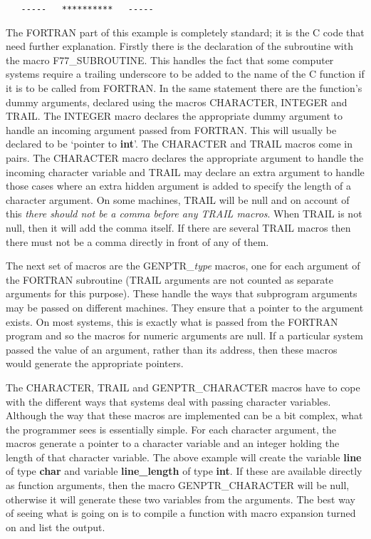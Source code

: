 \begin{verbatim}
   -----   **********   -----
\end{verbatim}

The FORTRAN part of this example is completely standard; it is the C code that
need further explanation. Firstly there is the declaration of the subroutine
with the macro F77\_SUBROUTINE. This handles the fact that some computer
systems require a trailing underscore to be added to the name of the C function
if it is to be called from FORTRAN. In the same statement there are the
function's dummy arguments, declared using the macros CHARACTER, INTEGER and
TRAIL. The INTEGER macro declares the appropriate dummy argument to handle an
incoming argument passed from FORTRAN. This will usually be declared to be
`pointer to {\bf int}'. The CHARACTER and TRAIL macros come in pairs. The
CHARACTER macro declares the appropriate argument to handle the incoming
character variable and TRAIL may declare an extra argument to handle those
cases where an extra hidden argument is added to specify the length of a
character argument. On some machines, TRAIL will be null and on account of this
{\em there should not be a comma before any TRAIL macros}. When TRAIL is not
null, then it will add the comma itself. If there are several TRAIL macros then
there must not be a comma directly in front of any of them.

The next set of macros are the GENPTR\_{\it type}\/ macros, one for each
argument of the FORTRAN subroutine (TRAIL arguments are not counted as separate
arguments for this purpose). These handle the ways that subprogram arguments
may be passed on different machines. They ensure that a pointer to the argument
exists. On most systems, this is exactly what is passed from the FORTRAN
program and so the macros for numeric arguments are null. If a particular
system passed the value of an argument, rather than its address, then these
macros would generate the appropriate pointers.

The CHARACTER, TRAIL and GENPTR\_CHARACTER macros have to cope with the
different ways that systems deal with passing character variables. Although the
way that these macros are implemented can be a bit complex, what the programmer
sees is essentially simple. For each character argument, the macros generate a
pointer to a character variable and an integer holding the length of that
character variable. The above example will create the variable {\bf line} of
type {\bf char \tt*} and variable {\bf line\_length} of type {\bf int}. If
these are available directly as function arguments, then the macro
GENPTR\_CHARACTER will be null, otherwise it will generate these two variables
from the arguments. The best way of seeing what is going on is to compile a
function with macro expansion turned on and list the output.

